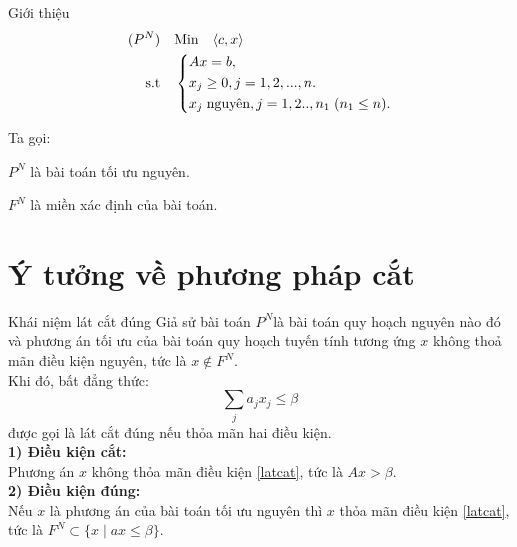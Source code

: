 \documentclass[10pt]{beamer}
\begin{document}
\begin{frame}{Giới thiệu}
    \begin{equation}\label{BTNchinhtac}
     \begin{split}
         {(P^N)} & \quad {\rm Min}  \quad\langle c,x \rangle\\
          \rm{s.t} &\quad \left\{\begin{split}
            & Ax= b,\\
           & x_j \ge 0, j=1,2,...,n.\\
            & x_j \hspace{0.1cm} \text{nguyên}, j=1,2..,n_1\hspace{0.1cm}(n_1\le n).\\
           \end{split}\right.
       \end{split}
   \end{equation}
   
   Ta gọi:
   
   $P^N$ là bài toán tối ưu nguyên.
   
$F^N$ là miền xác định của bài toán.
\end{frame}

\section*{Ý tưởng về phương pháp cắt}


\begin{frame}{Khái niệm lát cắt đúng}
     Giả sử bài toán $P^N$là bài toán quy hoạch nguyên nào đó và phương án tối ưu của bài toán quy hoạch tuyến tính tương ứng $x$ không thoả mãn điều kiện 
nguyên, tức là $x \notin  F^N$.\\
Khi đó, bất đẳng thức:
    $$\sum _j a_jx_j \le \beta$$\label{latcat}
    được gọi là lát cắt đúng nếu thỏa mãn hai điều kiện.\\
    
       \textbf{ 1) Điều kiện cắt:} \\
       Phương án $x$ không thỏa mãn điều kiện \eqref{latcat}, tức là $Ax > \beta$.\\
    \textbf{2) Điều kiện đúng:}\\
       Nếu $x$ là phương án của bài toán tối ưu nguyên thì $x$ thỏa mãn điều kiện \eqref{latcat}, tức là 
 $F^N \subset \{x\mid ax\le \beta\}$.\\
    \end{frame}
\end{document}

